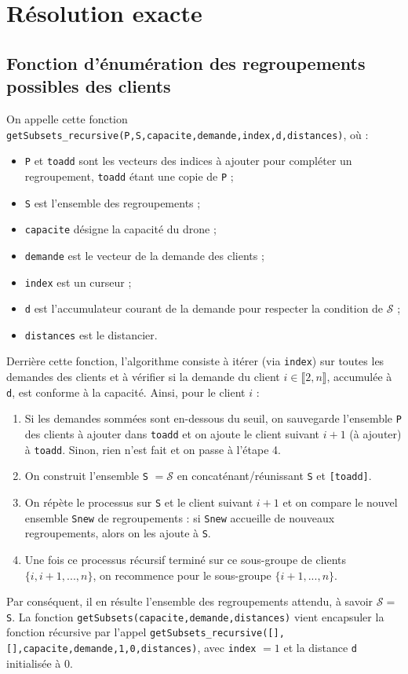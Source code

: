 \documentclass[french, 11pt, a4paper]{article} %
\newcommand{\Sc}{\mathcal{S}} %
\newcommand{\smb}{\smallbreak}
\begin{document}
\section{Résolution exacte}
\subsection{Fonction d'énumération des regroupements possibles des clients}
On appelle cette fonction \texttt{getSubsets\_recursive(P,S,capacite,demande,index,d,distances)},
où : \begin{itemize}
    \item \verb+P+ et \verb+toadd+ sont les vecteurs des indices à ajouter pour compléter un regroupement, \verb+toadd+ étant une copie de \verb+P+ ;
    \item \verb+S+ est l'ensemble des regroupements ;
    \item \verb+capacite+ désigne la capacité du drone ;
    \item \verb+demande+ est le vecteur de la demande des clients ;
    \item \verb+index+ est un curseur ;
    \item \verb+d+ est l'accumulateur courant de la demande pour respecter la condition de $\Sc$ ;
    \item \verb+distances+ est le distancier.
\end{itemize}

Derrière cette fonction, l'algorithme consiste à itérer (via \verb+index+) sur toutes les demandes des clients
et à vérifier si la demande du client $i \in \llbracket 2,n \rrbracket$, accumulée à \verb+d+, est conforme à la capacité. Ainsi,
pour le client $i$ : 
\begin{enumerate}
    \item Si les demandes sommées sont en-dessous du seuil, on sauvegarde l'ensemble \verb+P+ des clients à ajouter dans \verb+toadd+
    et on ajoute le client suivant $i+1$ (à ajouter) à \verb+toadd+. Sinon, rien n'est fait et on passe à l'étape 4.
    \item On construit l'ensemble \verb+S+ $= \Sc$ en concaténant/réunissant \verb+S+ et \verb+[toadd]+.
    \item On répète le processus sur \verb+S+ et le client suivant $i+1$ et on compare le nouvel ensemble \verb+Snew+
    de regroupements : si \verb+Snew+ accueille de nouveaux regroupements, alors on les ajoute à \verb+S+.
    \item Une fois ce processus récursif terminé sur ce sous-groupe de clients $\{i,i+1,...,n\}$, on recommence pour le sous-groupe
$\{i+1,...,n\}$.
\end{enumerate}
\smb Par conséquent, il en résulte l'ensemble des regroupements attendu, à savoir $\Sc = $ \verb+S+.
\smb La fonction \texttt{getSubsets(capacite,demande,distances)} vient encapsuler la fonction récursive par l'appel
\texttt{getSubsets\_recursive([],[],capacite,demande,1,0,distances)}, avec \verb+index+ $=1$ et la distance \verb+d+ initialisée à $0$.
\end{document}
